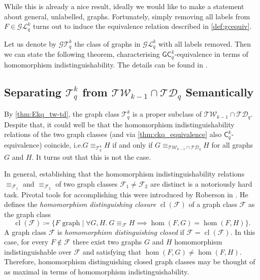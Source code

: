 \documentclass[10pt,a4paper]{article}
\newcommand{\Ekq}{\ensuremath{\mathcal{T}_{q}^{k}}}
\newcommand{\Lkq}{\ensuremath{\mathcal{L}_{q}^{k}}}
\newcommand{\GEkq}{\ensuremath{\mathcal{G}\Lkq}}
\newcommand{\GEkqLL}{\ensuremath{\mathcal{G}\Ekq}}
\newcommand{\lGC}{\ensuremath{\mathsf{GC}}}
\DeclareMathOperator{\cl}{cl}
\begin{document}
While this is already a nice result, ideally we would like to make a statement about general, unlabelled, graphs. Fortunately, simply removing all labels from $F \in \GEkq$ turns out to induce the equivalence relation described in \cref{def:gcequiv}.

Let us denote by $\GEkqLL$ the class of graphs in $\GEkq$ with all labels removed. Then we can state the following theorem, characterising $\lGC^k_q$-equivalence in terms of homomorphism indistinguishability.
The details can be found in .

\guardedEkqLogic*




 
\subsection{Separating $\Ekq$ from $\mathcal{TW}_{k-1} \cap \mathcal{TD}_q$ Semantically}
By \cref{thm:Ekq_tw-td}, the graph class $\Ekq$ is a proper subclass of $\mathcal{TW}_{k-1} \cap \mathcal{TD}_q$. Despite that, it could well be that the homomorphism indistinguishability relations of the two graph classes (and via \cref{thm:ckq_equivalence} also $\mathsf{C}^k_q$-equivalence) coincide, i.e.\@ $G \equiv_{\Ekq} H$ if and only if $G \equiv_{\mathcal{TW}_{k-1} \cap \mathcal{TD}_q} H$ for all graphs $G$ and $H$. It turns out that this is not the case.

In general, establishing that the homomorphism indistinguishability relations $\equiv_{\mathcal{F}_1}$ and $\equiv_{\mathcal{F}_2}$ of two graph classes $\mathcal{F}_1 \neq \mathcal{F}_2$ are distinct is a notoriously hard task. 
Pivotal tools for accomplishing this were introduced by Roberson in \cite{roberson_oddomorphisms_2022}. He defines the \emph{homomorphism distinguishing closure} $\cl(\mathcal{F})$ of a graph class $\mathcal{F}$ as the graph class
\[
\cl(\mathcal{F}) \coloneqq \{ F \text{ graph} \mid \forall G, H.\ G \equiv_{\mathcal{F}} H \implies \hom(F, G) = \hom(F, H)\}.
\]
A graph class $\mathcal{F}$ is \emph{homomorphism distinguishing closed} if $\mathcal{F} = \cl(\mathcal{F})$. In this case, for every $F \not\in \mathcal{F}$ there exist two graphs $G$ and $H$ homomorphism indistinguishable over $\mathcal{F}$ and satisfying that $\hom(F, G) \neq \hom(F, H)$. 
Therefore, homomorphism distinguishing closed graph classes may be thought of as maximal in terms of homomorphism indistinguishability.
\end{document}

